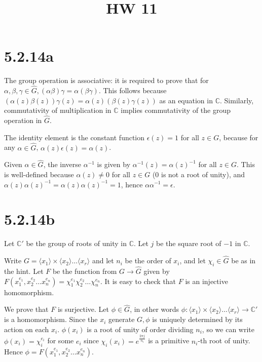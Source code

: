 \documentclass{article}
\title{HW 11}
\date{}
\def\C{\mathbb{C}}
\def\<{\langle}
\def\>{\rangle}
\def\inv{{-1}}
\begin{document}
\maketitle









\section*{5.2.14a}

The group operation is associative: it is required to prove that for $\alpha, \beta, \gamma \in \hat{G}, (\alpha\beta)\gamma = \alpha(\beta\gamma)$. This follows because $(\alpha(z)\beta(z))\gamma(z) = \alpha(z)(\beta(z)\gamma(z))$ as an equation in $\C$. Similarly, commutativity of multiplication in $\C$ implies commutativity of the group operation in $\hat{G}$.

The identity element is the constant function $\epsilon(z) = 1$ for all $z \in G$, because for any $\alpha \in \hat{G}$, $\alpha(z)\epsilon(z) = \alpha(z)$.

Given $\alpha \in \hat{G}$, the inverse $\alpha^\inv$ is given by $\alpha^\inv(z) = \alpha(z)^\inv$ for all $z \in G$. This is well-defined because $\alpha(z) \neq 0$ for all $z \in G$ (0 is not a root of unity), and $\alpha(z)\alpha(z)^\inv = \alpha(z) \alpha(z)^\inv = 1$, hence $\alpha \alpha^\inv = \epsilon$.

\section*{5.2.14b}

Let $\C'$ be the group of roots of unity in $\C$. Let $j$ be the square root of $-1$ in $\C$.

Write $G = \<x_1\> \times \<x_2\> \ldots \<x_r\>$ and let $n_i$ be the order of $x_i$, and let $\chi_i \in \hat{G}$ be as in the hint. Let $F$ be the function from $G \to \hat{G}$ given by $F(x_1^{e_1}, x_2^{e_2} \ldots x_n^{e_n}) = \chi_1^{e_1} \chi_2^{e_2} \ldots \chi_n^{e_n}$. It is easy to check that $F$ is an injective homomorphism.

We prove that $F$ is surjective. Let $\phi \in \hat{G}$, in other words $\phi : \<x_1\> \times \<x_2\> \ldots \<x_r\> \to \C'$ is a homomorphism. Since the $x_i$ generate $G, \phi$ is uniquely determined by its action on each $x_i$. $\phi(x_i)$ is a root of unity of order dividing $n_i$, so we can write $\phi(x_i) = \chi_i^{e_i}$ for some $e_i$ since $\chi_i(x_i) = e^\frac{2\pi j}{n_i}$ is a primitive $n_i$-th root of unity. Hence $\phi = F(x_1^{e_1}, x_2^{e_2} \ldots x_n^{e_n})$.
\end{document}

